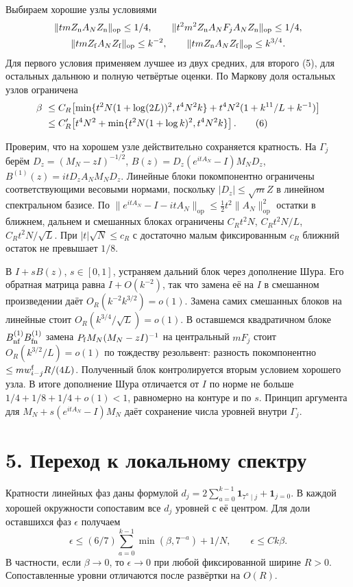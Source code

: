 \documentclass[11pt,a4paper]{article}
\newcommand{\sect}[1]{\section*{\sffamily\color{ink}#1}}
\newcommand{\op}{\mathrm{op}}
\begin{document}
Выбираем хорошие узлы условиями
\[
 \begin{gathered}
 \|tmZ_{\rm n} A_N Z_{\rm n}\|_{\op}\le1/4,\qquad
 \|t^2m^2Z_{\rm n}A_NF_jA_NZ_{\rm n}\|_{\op}\le1/4,\\
 \|tm Z_{\rm f} A_N Z_{\rm f}\|_{\op}\le k^{-2},\qquad
 \|tm Z_{\rm n} A_N Z_{\rm f}\|_{\op}\le k^{3/4}.
 \end{gathered}
\]
Для первого условия применяем лучшее из двух средних, для второго (5), для остальных дальнюю и полную четвёртые оценки. По Маркову доля остальных узлов ограничена
\begin{align}
   \beta\ &\le C_R\!\left[\min\{t^2N(1+\log(2L))^2,t^4N^2k\}
                     +t^4N^2(1+k^{11}/L+k^{-1})\right] \notag\\
   &\le C_R'\!\left[t^4N^2+\min\{t^2N(1+\log k)^2,t^4N^2k\}\right].
                                                               \tag{6}
\end{align}

Проверим, что на хорошем узле действительно сохраняется кратность. На \(\Gamma_j\) берём \(D_z=(M_N-zI)^{-1/2}\), \(B(z)=D_z(e^{itA_N}-I)M_ND_z\), \(B^{(1)}(z)=itD_z A_N M_N D_z\). Линейные блоки покомпонентно ограничены соответствующими весовыми нормами, поскольку \(|D_z|\le\sqrt m Z\) в линейном спектральном базисе. По \(\|e^{itA_N}-I-itA_N\|_{\op}\le \tfrac12 t^2\|A_N\|_{\op}^2\) остатки в ближнем, дальнем и смешанных блоках ограничены \(C_Rt^2 N\), \(C_Rt^2N/L\), \(C_Rt^2N/\sqrt L\). При \(|t|\sqrt N\le c_R\) с достаточно малым фиксированным \(c_R\) ближний остаток не превышает \(1/8\).

В \(I+sB(z)\), \(s\in[0,1]\), устраняем дальний блок через дополнение Шура. Его обратная матрица равна \(I+O(k^{-2})\), так что замена её на \(I\) в смешанном произведении даёт \(O_R(k^{-2}k^{3/2})=o(1)\). Замена самих смешанных блоков на линейные стоит \(O_R(k^{3/4}/\sqrt L)=o(1)\). В оставшемся квадратичном блоке \(B_{\rm nf}^{(1)}B_{\rm fn}^{(1)}\) замена \(P_{\rm f}M_N(M_N-zI)^{-1}\) на центральный \(mF_j\) стоит \(O_R(k^{3/2}/L)=o(1)\) по тождеству резольвент: разность покомпонентно \(\le m w^{\rm f}_{i-j}R/(4L)\). Полученный блок контролируется вторым условием хорошего узла. В итоге дополнение Шура отличается от \(I\) по норме не больше \(1/4+1/8+1/4+o(1)<1\), равномерно на контуре и по \(s\). Принцип аргумента для \(M_N+s(e^{itA_N}-I)M_N\) даёт сохранение числа уровней внутри \(\Gamma_j\).
\newpage
\sect{5. Переход к локальному спектру}
Кратности линейных фаз даны формулой
\(d_j=2\sum_{a=0}^{k-1}\mathbf1_{7^a\mid j}+\mathbf1_{j=0}\).
В каждой хорошей окружности сопоставим все \(d_j\) уровней с её центром. Для доли оставшихся фаз \(\epsilon\) получаем
\[
  \epsilon\le(6/7)\sum_{a=0}^{k-1}\min(\beta,7^{-a})+1/N,
         \qquad \epsilon\le Ck\beta .
\]
В частности, если \(\beta\to0\), то \(\epsilon\to0\) при любой фиксированной ширине \(R>0\). Сопоставленные уровни отличаются после развёртки на \(O(R)\).
\end{document}
